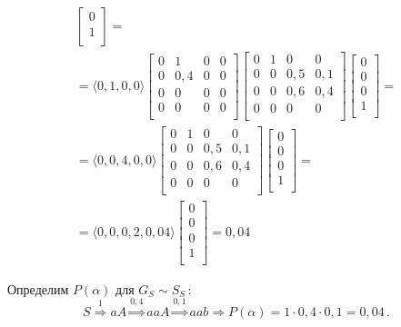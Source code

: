 \begin{ex}
\begin{list}{)}{}
\begin{gather*}
\begin{bmatrix}
        0\\
        1\\
      \end{bmatrix}
      =\\
      = \langle 0,1,0,0 \rangle
      \begin{bmatrix}
        0 & 1 & 0 & 0\\
        0 & 0{,}4 & 0 & 0\\
        0 & 0 & 0 & 0\\
        0 & 0 & 0 & 0\\
      \end{bmatrix}
      \begin{bmatrix}
        0 & 1 & 0 & 0\\
        0 & 0 & 0{,}5 & 0{,}1\\
        0 & 0 & 0{,}6 & 0{,}4\\
        0 & 0 & 0 & 0\\
      \end{bmatrix}
      \begin{bmatrix}
        0\\
        0\\
        0\\
        1\\
      \end{bmatrix} = \\
      = \langle 0,0{,}4,0,0 \rangle
      \begin{bmatrix}
        0 & 1 & 0 & 0\\
        0 & 0 & 0{,}5 & 0{,}1\\
        0 & 0 & 0{,}6 & 0{,}4\\
        0 & 0 & 0 & 0\\
      \end{bmatrix}
      \begin{bmatrix}
        0\\
        0\\
        0\\
        1\\
      \end{bmatrix} = \\
      = \langle 0,0,0{,}2,0{,}04 \rangle
      \begin{bmatrix}
        0\\
        0\\
        0\\
        1\\
      \end{bmatrix} = 0{,}04
    \end{gather*}
  \item Определим $P(\alpha)$ для $G_S \sim S_S$\,:
    $$S \stackrel{1}{\Rightarrow} aA \stackrel{0{,}4}{\Rightarrow} aaA
    \stackrel{0{,}1}{\Rightarrow} aab \Rightarrow P(\alpha) = 1 \cdot
    0{,}4 \cdot 0{,}1 = 0{,}04\,.$$
  \end{list}
\end{ex}


